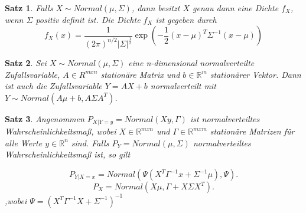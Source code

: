 \documentclass[12pt,a4paper]{scrartcl}
\newtheorem{Satz}{Satz}[section]
\numberwithin{equation}{section}
\newcommand{\R}{\mathbb{R}} %
\begin{document}
\begin{Satz} Falls $X \sim Normal(\mu,\varSigma)$, dann besitzt $X$ genau dann eine Dichte $f_X$, wenn 
$\varSigma$ positiv definit ist. Die Dichte $f_{X}$ ist gegeben durch 
\begin{equation}
f_{X}(x) = \frac{1}{(2\pi)^{n/2}|\varSigma|^{\frac{1}{2}}}\exp(-\frac{1}{2}(x-\mu)^{T}\varSigma^{-1}(x-\mu)) 
\end{equation}

\end{Satz}

\begin{Satz}
 Sei $X \sim Normal(\mu,\varSigma)$ eine n-dimensional normalverteilte Zufallsvariable,
 $A \in R^{mxn}$ stationäre Matrix und $b \in \R^m$ stationärer Vektor. Dann ist auch die Zufallsvariable 
 $Y = AX + b$ normalverteilt mit $Y \sim Normal(A\mu + b, A\varSigma A^{T})$.
\end{Satz}

\begin{Satz}
 Angenommen $P_{X|Y=y}=Normal(Xy,\Gamma)$ ist normalverteiltes Wahrscheinlichkeitsmaß, wobei 
 $X \in \R^{mxn}$ und $\Gamma \in \R^{mxm}$ stationäre Matrizen für alle Werte $y \in \R^{n}$ sind. Falls
 $P_{Y} = Normal(\mu,\varSigma)$ normalverteiltes Wahrscheinlichkeitsmaß ist, so gilt
 
 \begin{equation}
 P_{Y|X=x} = Normal(\Psi(X^{T}\Gamma^{-1}x+\varSigma^{-1}\mu),\Psi).
 \end{equation}
 \begin{equation}
  P_{X} = Normal(X\mu,\Gamma+X\varSigma X^{T}).
 \end{equation}
 ,wobei $\Psi = (X^{T}\Gamma^{-1}X+\varSigma^{-1})^{-1}$
\end{Satz}
\end{document}
